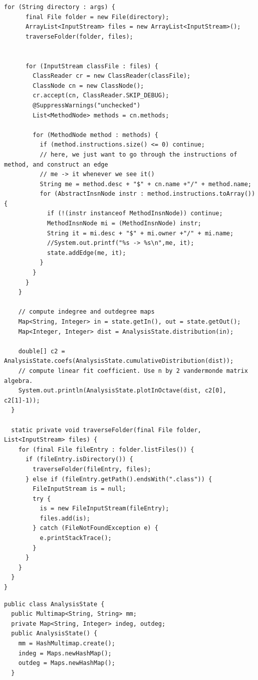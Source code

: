 \documentclass[11pt,a4paper,twocolumn]{article}
\begin{document}
\begin{singlespace}
\begin{appendices}
\begin{lstlisting}[caption={Main.java}]
    for (String directory : args) {
      final File folder = new File(directory);
      ArrayList<InputStream> files = new ArrayList<InputStream>();
      traverseFolder(folder, files);


      for (InputStream classFile : files) {
        ClassReader cr = new ClassReader(classFile);
        ClassNode cn = new ClassNode();
        cr.accept(cn, ClassReader.SKIP_DEBUG);
        @SuppressWarnings("unchecked")
        List<MethodNode> methods = cn.methods;

        for (MethodNode method : methods) {
          if (method.instructions.size() <= 0) continue;
          // here, we just want to go through the instructions of method, and construct an edge
          // me -> it whenever we see it()
          String me = method.desc + "$" + cn.name +"/" + method.name;
          for (AbstractInsnNode instr : method.instructions.toArray()) {
            if (!(instr instanceof MethodInsnNode)) continue;
            MethodInsnNode mi = (MethodInsnNode) instr;
            String it = mi.desc + "$" + mi.owner +"/" + mi.name;
            //System.out.printf("%s -> %s\n",me, it);
            state.addEdge(me, it);
          }
        }
      }
    }

    // compute indegree and outdegree maps
    Map<String, Integer> in = state.getIn(), out = state.getOut();
    Map<Integer, Integer> dist = AnalysisState.distribution(in);

    double[] c2 = AnalysisState.coefs(AnalysisState.cumulativeDistribution(dist));
    // compute linear fit coefficient. Use n by 2 vandermonde matrix algebra.
    System.out.println(AnalysisState.plotInOctave(dist, c2[0], c2[1]-1));
  }

  static private void traverseFolder(final File folder, List<InputStream> files) {
    for (final File fileEntry : folder.listFiles()) {
      if (fileEntry.isDirectory()) {
        traverseFolder(fileEntry, files);
      } else if (fileEntry.getPath().endsWith(".class")) {
        FileInputStream is = null;
        try {
          is = new FileInputStream(fileEntry);
          files.add(is);
        } catch (FileNotFoundException e) {
          e.printStackTrace();
        }
      }
    }
  }
}
\end{lstlisting}
\begin{lstlisting}[caption={AnalysisState.java}]
public class AnalysisState {
  public Multimap<String, String> mm;
  private Map<String, Integer> indeg, outdeg;
  public AnalysisState() {
    mm = HashMultimap.create();
    indeg = Maps.newHashMap();
    outdeg = Maps.newHashMap();
  }


\end{lstlisting}
\end{appendices}
\end{singlespace}
\end{document}
